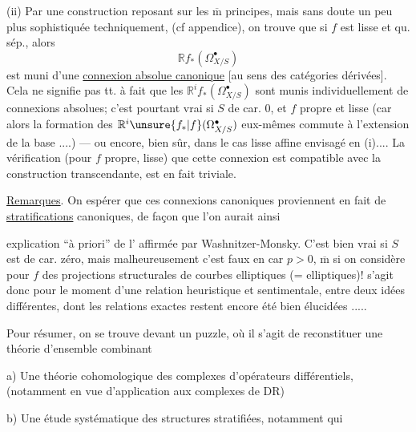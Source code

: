 (ii) Par une construction reposant  sur les $\overline{\mathrm m}$ principes, mais sans doute un peu plus sophistiquée techniquement, (cf appendice), on trouve que si $f$ est lisse  et qu. sép., alors
\[
\mathbb{R}f_*(\Omega^\bullet_{X/S})
\]
est muni d'une \uline{connexion absolue canonique} [au sens des catégories dérivées].
Cela ne signifie pas tt. à fait que les $\mathbb{R}^if_*(\Omega^\bullet_{X/S})$ sont munis individuellement de connexions absolues; c'est pourtant vrai si $S$ de car. 0, et $f$ propre et lisse (car alors la formation des $\mathbb{R}^i\unsure{f_*|f}(\Omega^\bullet_{X/S})$ eux-mêmes commute à l'extension de la base ....) --- ou encore, bien sûr, dans le cas lisse affine envisagé en (i)....
La vérification (pour $f$ propre, lisse) que cette connexion est compatible avec la construction transcendante, est en fait triviale.

\uline{Remarques}. On  espérer que ces connexions canoniques proviennent en fait de \uline{stratifications} canoniques, de façon que l'on aurait ainsi


explication ``à priori'' de l'  affirmée par Washnitzer-Monsky.
C'est bien vrai si $S$ est de car. zéro, mais malheureusement c'est faux en car $p>0$, $\overline{\mathrm m}$ si on considère pour $f$ des projections structurales de  courbes elliptiques (=  elliptiques)!
 s'agit donc pour le moment d'une relation heuristique et sentimentale, entre deux idées différentes, dont les relations exactes restent   encore  été bien élucidées .....


Pour résumer, on se trouve  devant un puzzle, où il s'agit de reconstituer une théorie d'ensemble   combinant

a) Une théorie cohomologique des complexes d'opérateurs différentiels,  (notamment en vue d'application aux complexes de DR)

b) Une étude systématique des structures stratifiées, notamment   qui 

